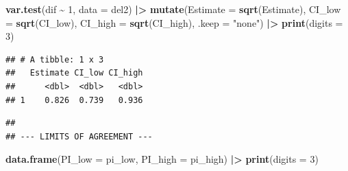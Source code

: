 \documentclass[
]{article}
\newenvironment{Shaded}{\begin{snugshade}}{\end{snugshade}}
\newcommand{\AttributeTok}[1]{\textcolor[rgb]{0.13,0.29,0.53}{#1}}
\newcommand{\CommentTok}[1]{\textcolor[rgb]{0.56,0.35,0.01}{\textit{#1}}}
\newcommand{\DecValTok}[1]{\textcolor[rgb]{0.00,0.00,0.81}{#1}}
\newcommand{\FloatTok}[1]{\textcolor[rgb]{0.00,0.00,0.81}{#1}}
\newcommand{\FunctionTok}[1]{\textcolor[rgb]{0.13,0.29,0.53}{\textbf{#1}}}
\newcommand{\NormalTok}[1]{#1}
\newcommand{\OtherTok}[1]{\textcolor[rgb]{0.56,0.35,0.01}{#1}}
\newcommand{\SpecialCharTok}[1]{\textcolor[rgb]{0.81,0.36,0.00}{\textbf{#1}}}
\newcommand{\StringTok}[1]{\textcolor[rgb]{0.31,0.60,0.02}{#1}}
\begin{document}
\begin{Shaded}
\begin{Highlighting}[]
\FunctionTok{var.test}\NormalTok{(dif }\SpecialCharTok{\textasciitilde{}} \DecValTok{1}\NormalTok{, }\AttributeTok{data =}\NormalTok{ del2) }\SpecialCharTok{|\textgreater{}}
  \FunctionTok{mutate}\NormalTok{(}\AttributeTok{Estimate =} \FunctionTok{sqrt}\NormalTok{(Estimate),}
         \AttributeTok{CI\_low =} \FunctionTok{sqrt}\NormalTok{(CI\_low),}
         \AttributeTok{CI\_high =} \FunctionTok{sqrt}\NormalTok{(CI\_high),}
         \AttributeTok{.keep =} \StringTok{"none"}\NormalTok{) }\SpecialCharTok{|\textgreater{}}
  \FunctionTok{print}\NormalTok{(}\AttributeTok{digits =} \DecValTok{3}\NormalTok{)}
\end{Highlighting}
\end{Shaded}

\begin{verbatim}
## # A tibble: 1 x 3
##   Estimate CI_low CI_high
##      <dbl>  <dbl>   <dbl>
## 1    0.826  0.739   0.936
\end{verbatim}

\begin{Shaded}
\end{Shaded}

\begin{verbatim}
## 
## --- LIMITS OF AGREEMENT ---
\end{verbatim}

\begin{Shaded}
\begin{Highlighting}[]
\FunctionTok{data.frame}\NormalTok{(}\AttributeTok{PI\_low =}\NormalTok{ pi\_low, }\AttributeTok{PI\_high =}\NormalTok{ pi\_high) }\SpecialCharTok{|\textgreater{}}
  \FunctionTok{print}\NormalTok{(}\AttributeTok{digits =} \DecValTok{3}\NormalTok{)}
\end{Highlighting}
\end{Shaded}
\end{document}
